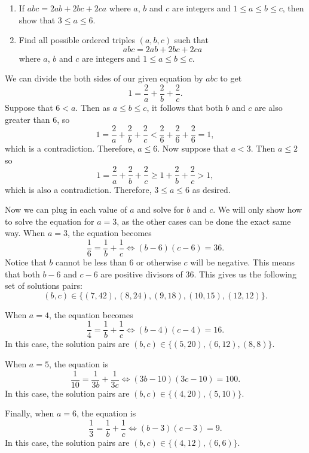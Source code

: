 \begin{question}
    \begin{enumerate}
        \item If $abc = 2ab + 2bc +2ca$ where $a$, $b$ and $c$ are integers and
            $1 \leq a \leq b \leq c$, then show that $3 \leq a \leq 6$.
        
        \item Find all possible ordered triples $(a,b,c)$ such that \[abc = 2ab
            + 2bc + 2ca\] where $a$, $b$ and $c$ are integers and $1 \leq a
            \leq b \leq c$. 
    \end{enumerate}
\end{question}
\begin{solution}
    We can divide the both sides of our given equation by $abc$ to get
    \[ 1 = \frac{2}{a} + \frac{2}{b} + \frac{2}{c}. \]
    Suppose that $6 < a$. Then as $a \leq b \leq c$, it follows that both $b$
    and $c$ are also greater than 6, so
    \[ 1 = \frac{2}{a} + \frac{2}{b} + \frac{2}{c} < \frac{2}{6} + \frac{2}{6}
    + \frac{2}{6} = 1, \]
    which is a contradiction. Therefore, $a \leq 6$. Now suppose that $a < 3$.
    Then $a \leq 2$ so
    \[ 1 = \frac{2}{a} + \frac{2}{b} + \frac{2}{c} \geq 1 + \frac{2}{b} +
    \frac{2}{c} > 1, \]
    which is also a contradiction. Therefore, $3 \leq a \leq 6$ as desired.

    Now we can plug in each value of $a$ and solve for $b$ and $c$. We will
    only show how to solve the equation for $a = 3$, as the other cases can be
    done the exact same way.
    When $a = 3$, the equation becomes
    \[ \frac{1}{6} = \frac{1}{b} + \frac{1}{c} \Longleftrightarrow (b - 6)(c -
    6) = 36. \]
    Notice that $b$ cannot be less than 6 or otherwise $c$ will be negative.
    This means that both $b - 6$ and $c - 6$ are positive divisors of 36. This
    gives us the following set of solutions pairs:
    \[ (b, c) \in \{ (7, 42) , (8, 24), (9, 18), (10, 15), (12, 12) \}. \]

    When $a = 4$, the equation becomes
    \[ \frac{1}{4} = \frac{1}{b} + \frac{1}{c} \Longleftrightarrow (b - 4)(c -
    4) = 16. \]
    In this case, the solution pairs are $(b, c) \in \{ (5, 20), (6, 12), (8,
    8) \}$. 
    
    When $a = 5$, the equation is
    \[ \frac{1}{10} = \frac{1}{3b} + \frac{1}{3c} \Longleftrightarrow (3b -
    10)(3c - 10) = 100. \]
    In this case, the solution pairs are $(b, c) \in \{(4, 20), (5, 10) \}$. 
    
    Finally, when $a = 6$, the equation is
    \[ \frac{1}{3} = \frac{1}{b} + \frac{1}{c} \Longleftrightarrow (b - 3)(c -
    3) = 9. \]
    In this case, the solution pairs are $(b, c) \in \{(4, 12), (6, 6) \}$. 
    

\end{solution}
